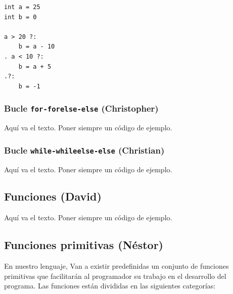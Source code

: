 \documentclass[11pt, english]{article}
\begin{document}
\begin{lstlisting}[frame=single, caption=Ejemplo de uso de la sentencia \texttt{if-ifelse-else}]
int a = 25
int b = 0

a > 20 ?:
	b = a - 10
. a < 10 ?:
	b = a + 5
.?:
	b = -1
\end{lstlisting}

\subsubsection{Bucle \texttt{for-forelse-else} (Christopher)}
Aquí va el texto. Poner siempre un código de ejemplo.

\subsubsection{Bucle \texttt{while-whileelse-else} (Christian)}
Aquí va el texto. Poner siempre un código de ejemplo.
\newpage

\subsection{Funciones (David)}
Aquí va el texto. Poner siempre un código de ejemplo.
\newpage

\subsection{Funciones primitivas (Néstor)}
En nuestro lenguaje, Van a existir predefinidas un conjunto de funciones primitivas que facilitarán al programador su trabajo en el desarrollo del programa. Las funciones están divididas en las siguientes categorías:
\end{document}
